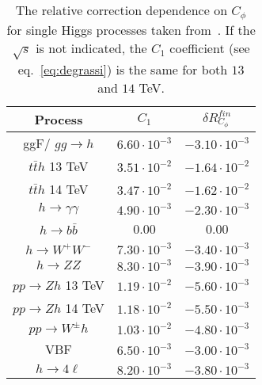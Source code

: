 	\begin{table}[h]
		\centering
		\begin{tabular}{ccc}
			\toprule
			Process&$C_1$ & $\delta R_{C_\phi}^{fin}$ \\
			\midrule
			ggF/ $gg\to h$  & $6.60\cdot 10^{-3}$ &  $-3.10\cdot 10^{-3}$ \\
			$t\bar{t}h$   \textcolor{Mahogany}{13 TeV} & $3.51\cdot 10^{-2}$  &  $-1.64\cdot 10^{-2}$  \\
			$t\bar{t}h$   \textcolor{Mahogany}{14 TeV} & $3.47\cdot 10^{-2}$  &  $-1.62\cdot 10^{-2}$ \\
			$h\to \gamma \gamma$   & $4.90\cdot 10^{-3}$ &  $-2.30\cdot 10^{-3}$ \\
			$h\to b\bar{b}$ & 0.00&0.00  \\
			$h\to W^+ W^-$  & $7.30\cdot 10^{-3}$  & $-3.40\cdot 10^{-3}$ \\
			$h\to Z Z$      & $8.30\cdot 10^{-3}$&  $-3.90\cdot 10^{-3}$ \\
			$pp\to Zh$   \textcolor{Mahogany}{13 TeV}    & $1.19\cdot 10^{-2}$& $-5.60\cdot 10^{-3}$ \\
			$pp\to Zh$    \textcolor{Mahogany}{14 TeV}    &$1.18\cdot 10^{-2}$&  $-5.50\cdot 10^{-3}$ \\
			$pp\to W^\pm h$  & $1.03\cdot 10^{-2}$ &    $-4.80\cdot 10^{-3}$\\
			VBF              & $6.50\cdot 10^{-3}$&   $-3.00\cdot 10^{-3}$ \\
			$ h \to 4 \ell$       &     $8.20\cdot 10^{-3}$  &   $-3.80\cdot 10^{-3}$ \\
			\bottomrule
		\end{tabular}
		\caption{The relative correction dependence on $C_\phi$ for single Higgs processes taken from~\cite{ Degrassi:2021uik}. If the $\sqrt{s}$ is not indicated, the $C_1$ coefficient (see eq.~\eqref{eq:degrassi}) is the same for both $13$ and $14$ TeV.}
		\label{table:resch}
	\end{table}

